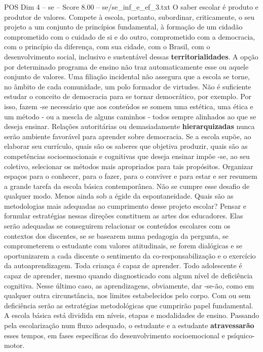 \begin{textsample}{POS Dim 4 – se – Score 8.00 – se/se\_inf\_e\_ef\_3.txt}  \label{ex:f4_pos_145}
O saber escolar é produto e produtor de valores.
Compete à escola, portanto, subordinar, criticamente, o seu projeto a um conjunto de princípios fundamental, à formação de um cidadão comprometido com o cuidado de si e do outro, comprometido com a democracia, com o princípio da diferença, com sua cidade, com o Brasil, com o desenvolvimento social, inclusivo e sustentável dessas \textbf{territorialidades}.
A opção por determinado programa de ensino não traz automaticamente esse ou aquele conjunto de valores.
Uma filiação incidental não assegura que a escola se torne, no âmbito de cada comunidade, um polo formador de virtudes.
Não é suficiente estudar o conceito de democracia para se tornar democrático, por exemplo.
Por isso, fazem -se necessário que aos conteúdos se somem uma estética, uma ética e um método - ou a mescla de alguns caminhos - todos sempre alinhados ao que se deseja ensinar.
Relações autoritárias ou demasiadamente \textbf{hierarquizadas} nunca serão ambiente favorável para aprender sobre democracia.
Se a escola supõe, ao elaborar seu currículo, quais são os saberes que objetiva produzir, quais são as competências socioemocionais e cognitivas que deseja ensinar impõe -se, ao seu coletivo, selecionar os métodos mais apropriados para tais propósitos.
Organizar espaços para o conhecer, para o fazer, para o conviver e para estar e ser resumem a grande tarefa da escola básica contemporânea.
Não se cumpre esse desafio de qualquer modo.
Menos ainda sob a égide da espontaneidade.
Quais são as metodologias mais adequadas ao cumprimento desse projeto escolar?
Pensar e formular estratégias nessas direções constituem as artes dos educadores.
Elas serão adequadas se conseguirem relacionar os conteúdos escolares com os contextos dos discentes, se se basearem numa pedagogia da pergunta, se comprometerem o estudante com valores atitudinais, se forem dialógicas e se oportunizarem a cada discente o sentimento da co-responsabilização e o exercício da autoaprendizagem.
Toda criança é capaz de aprender.
Todo adolescente é capaz de aprender, mesmo quando diagnosticado com algum nível de deficiência cognitiva.
Nesse último caso, as aprendizagens, obviamente, dar -se-ão, como em qualquer outra circunstância, nos limites estabelecidos pelo corpo.
Com ou sem deficiência serão as estratégias metodológicas que cumprirão papel fundamental.
A escola básica está dividida em níveis, etapas e modalidades de ensino.
Passando pela escolarização num fluxo adequado, o estudante e a estudante \textbf{atravessarão} esses tempos, em fases específicas do desenvolvimento socioemocional e psíquico-motor.

\end{textsample}
